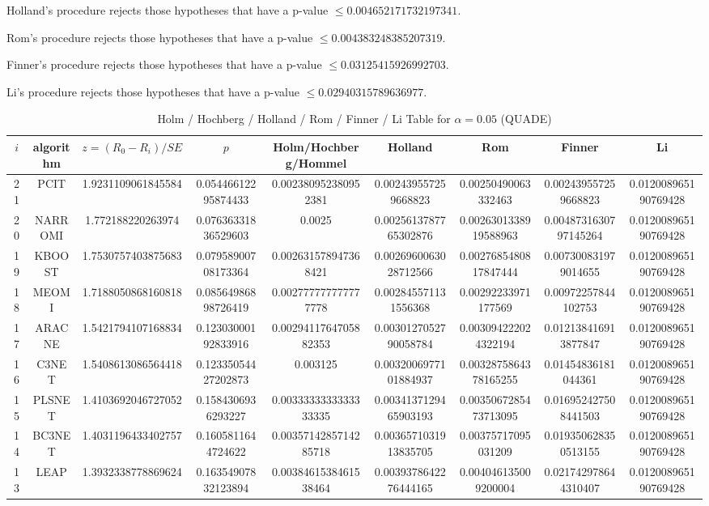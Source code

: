 \documentclass[a4paper,10pt]{article}
\begin{document}
\begin{landscape}
Holland's procedure rejects those hypotheses that have a p-value $\le0.004652171732197341$.


Rom's procedure rejects those hypotheses that have a p-value $\le0.004383248385207319$.


Finner's procedure rejects those hypotheses that have a p-value $\le0.03125415926992703$.


Li's procedure rejects those hypotheses that have a p-value $\le0.02940315789636977$.



\newpage

\begin{table}[!htp]
\centering\scriptsize
\caption{Holm / Hochberg / Holland / Rom / Finner / Li Table for $\alpha=0.05$ (QUADE)}
\begin{tabular}{ccccccccc}
$i$&algorithm&$z=(R_0 - R_i)/SE$&$p$&Holm/Hochberg/Hommel&Holland&Rom&Finner&Li\\
\hline
21&PCIT&1.9231109061845584&0.05446612295874433&0.002380952380952381&0.002439557259668823&0.00250490063332463&0.002439557259668823&0.012008965190769428\\
20&NARROMI&1.772188220263974&0.07636331836529603&0.0025&0.0025613787765302876&0.0026301338919588963&0.0048731630797145264&0.012008965190769428\\
19&KBOOST&1.7530757403875683&0.07958900708173364&0.002631578947368421&0.0026960063028712566&0.0027685480817847444&0.007300831979014655&0.012008965190769428\\
18&MEOMI&1.7188050868160818&0.08564986898726419&0.002777777777777778&0.002845571131556368&0.00292233971177569&0.00972257844102753&0.012008965190769428\\
17&ARACNE&1.5421794107168834&0.12303000192833916&0.0029411764705882353&0.0030127052790058784&0.003094222024322194&0.012138416913877847&0.012008965190769428\\
16&C3NET&1.5408613086564418&0.12335054427202873&0.003125&0.0032006977101884937&0.0032875864378165255&0.01454836181044361&0.012008965190769428\\
15&PLSNET&1.4103692046727052&0.1584306936293227&0.0033333333333333335&0.0034137129465903193&0.0035067285473713095&0.016952427508441503&0.012008965190769428\\
14&BC3NET&1.4031196433402757&0.1605811644724622&0.0035714285714285718&0.0036571031913835705&0.00375717095031209&0.019350628350513155&0.012008965190769428\\
13&LEAP&1.3932338778869624&0.16354907832123894&0.0038461538461538464&0.0039378642276444165&0.004046135009200004&0.021742978644310407&0.012008965190769428\\

\end{tabular}
\end{table}
\end{landscape}
\end{document}
